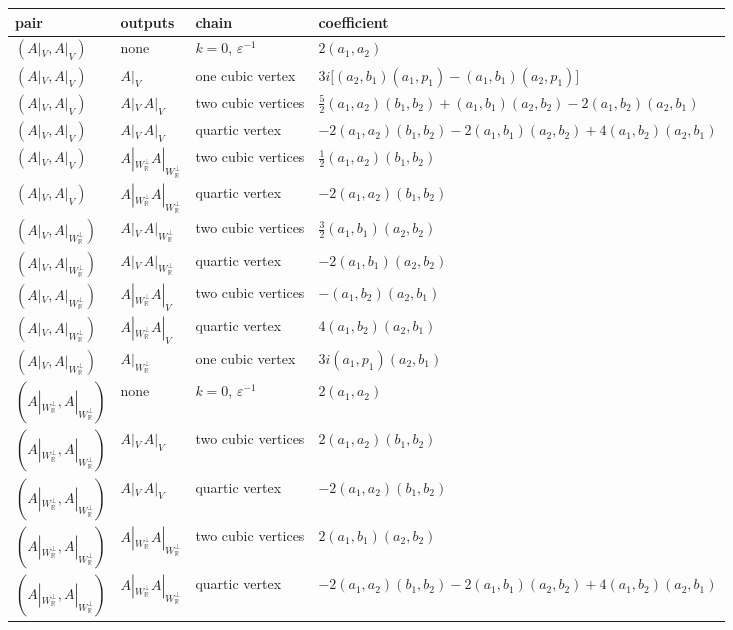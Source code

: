 \begin{tabular}{l|l|l|l}
pair & outputs & chain & coefficient \\
\hline
$(A|_V,A|_V)$ & none & $k=0$, $\varepsilon^{-1}$ & $2(a_1,a_2)$ \\
$(A|_V,A|_V)$ & $A|_V$ & one cubic vertex & $3i\big[(a_2,b_1)(a_1,p_1)-(a_1,b_1)(a_2,p_1)\big]$ \\
$(A|_V,A|_V)$ & $A|_V\,A|_V$ & two cubic vertices & $\tfrac52(a_1,a_2)(b_1,b_2)+(a_1,b_1)(a_2,b_2)-2(a_1,b_2)(a_2,b_1)$ \\
$(A|_V,A|_V)$ & $A|_V\,A|_V$ & quartic vertex & $-2(a_1,a_2)(b_1,b_2)-2(a_1,b_1)(a_2,b_2)+4(a_1,b_2)(a_2,b_1)$ \\
$(A|_V,A|_V)$ & $A|_{W_{\mathbb R}^\perp}A|_{W_{\mathbb R}^\perp}$ & two cubic vertices & $\tfrac12(a_1,a_2)(b_1,b_2)$ \\
$(A|_V,A|_V)$ & $A|_{W_{\mathbb R}^\perp}A|_{W_{\mathbb R}^\perp}$ & quartic vertex & $-2(a_1,a_2)(b_1,b_2)$ \\
$(A|_V,A|_{W_{\mathbb R}^\perp})$ & $A|_V\,A|_{W_{\mathbb R}^\perp}$ & two cubic vertices & $\tfrac32(a_1,b_1)(a_2,b_2)$ \\
$(A|_V,A|_{W_{\mathbb R}^\perp})$ & $A|_V\,A|_{W_{\mathbb R}^\perp}$ & quartic vertex & $-2(a_1,b_1)(a_2,b_2)$ \\
$(A|_V,A|_{W_{\mathbb R}^\perp})$ & $A|_{W_{\mathbb R}^\perp}A|_V$ & two cubic vertices & $-(a_1,b_2)(a_2,b_1)$ \\
$(A|_V,A|_{W_{\mathbb R}^\perp})$ & $A|_{W_{\mathbb R}^\perp}A|_V$ & quartic vertex & $4(a_1,b_2)(a_2,b_1)$ \\
$(A|_V,A|_{W_{\mathbb R}^\perp})$ & $A|_{W_{\mathbb R}^\perp}$ & one cubic vertex & $3i(a_1,p_1)(a_2,b_1)$ \\
$(A|_{W_{\mathbb R}^\perp},A|_{W_{\mathbb R}^\perp})$ & none & $k=0$, $\varepsilon^{-1}$ & $2(a_1,a_2)$ \\
$(A|_{W_{\mathbb R}^\perp},A|_{W_{\mathbb R}^\perp})$ & $A|_V\,A|_V$ & two cubic vertices & $2(a_1,a_2)(b_1,b_2)$ \\
$(A|_{W_{\mathbb R}^\perp},A|_{W_{\mathbb R}^\perp})$ & $A|_V\,A|_V$ & quartic vertex & $-2(a_1,a_2)(b_1,b_2)$ \\
$(A|_{W_{\mathbb R}^\perp},A|_{W_{\mathbb R}^\perp})$ & $A|_{W_{\mathbb R}^\perp}A|_{W_{\mathbb R}^\perp}$ & two cubic vertices & $2(a_1,b_1)(a_2,b_2)$ \\
$(A|_{W_{\mathbb R}^\perp},A|_{W_{\mathbb R}^\perp})$ & $A|_{W_{\mathbb R}^\perp}A|_{W_{\mathbb R}^\perp}$ & quartic vertex & $-2(a_1,a_2)(b_1,b_2)-2(a_1,b_1)(a_2,b_2)+4(a_1,b_2)(a_2,b_1)$ \\
\end{tabular}

